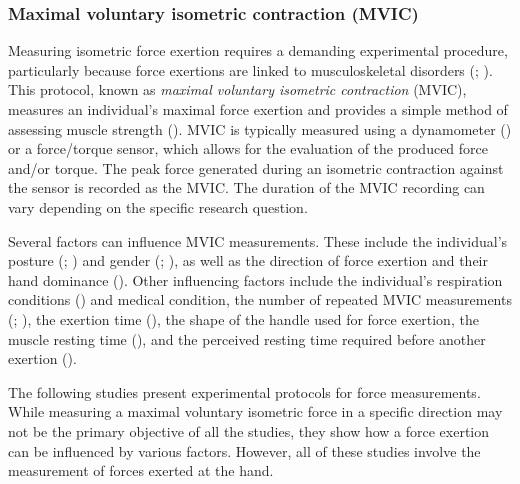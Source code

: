\subsubsection*{Maximal voluntary isometric contraction (MVIC)}
\label{subsec:mvic}

Measuring isometric force exertion requires a demanding experimental procedure, particularly because force exertions are linked to musculoskeletal disorders (\cite{hoozemansPushingPullingRelation1998}; \cite{hoozemansMechanicalLoadingLow2004}). This protocol, known as \emph{maximal voluntary isometric contraction} (MVIC), measures an individual's maximal force exertion and provides a simple method of assessing muscle strength (\cite{meldrumMaximumVoluntaryIsometric2007}). MVIC is typically measured using a dynamometer (\cite{robertsReviewMeasurementGrip2011}) or a force/torque sensor, which allows for the evaluation of the produced force and/or torque. The peak force generated during an isometric contraction against the sensor is recorded as the MVIC. The duration of the MVIC recording can vary depending on the specific research question.

Several factors can influence MVIC measurements. These include the individual's posture (\cite{watanabeShortTermReliabilityGrip2005}; \cite{robertsReviewMeasurementGrip2011}) and gender (\cite{vanderbeekGenderDifferencesExerted2000}; \cite{robertsReviewMeasurementGrip2011}), as well as the direction of force exertion and their hand dominance (\cite{jansenEffectsFingernailLength2000}). Other influencing factors include the individual's respiration conditions (\cite{leeComparisonMaximumVoluntary2016}) and medical condition, the number of repeated MVIC measurements (\cite{watanabeShortTermReliabilityGrip2005}; \cite{robertsReviewMeasurementGrip2011}), the exertion time (\cite{roseFatigueRecoveryStatic2014}), the shape of the handle used for force exertion, the muscle resting time (\cite{watanabeShortTermReliabilityGrip2005}), and the perceived resting time required before another exertion (\cite{roseFatigueRecoveryStatic2014}).


The following studies present experimental protocols for force measurements. While measuring a maximal voluntary isometric force in a specific direction may not be the primary objective of all the studies, they show how a force exertion can be influenced by various factors. However, all of these studies involve the measurement of forces exerted at the hand.

